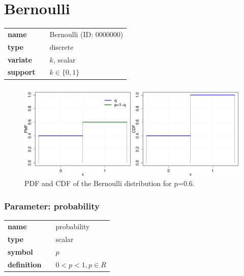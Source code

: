 
\section*{Bernoulli} 

  \bigskip 

\begin{tabular}{p{2cm}cl}
\textbf{name} & & Bernoulli (ID: 0000000)\\ 
 
\textbf{type} & & discrete \\ 

\textbf{variate} & & $k$, scalar \\ 

\textbf{support} & & $k \in \{0,1\}$
\end{tabular}

\begin{figure}[ht!]
\centering
  \includegraphics[width=140mm]{pics/Bernoulli_pmf_cdf.pdf}
 \caption{PDF and CDF of the Bernoulli distribution for p=0.6.}
 \label{fig:Bernoulli_pmf_cdf}
\end{figure}

\subsubsection*{Parameter: probability}

\noindent\begin{tabular}{p{2cm}cl}
\textbf{name} & & probability \\
\textbf{type} & & scalar \\
\textbf{symbol} & & $p$  \\
\textbf{definition} & & $0<p<1, p \in  R$
\end{tabular}
